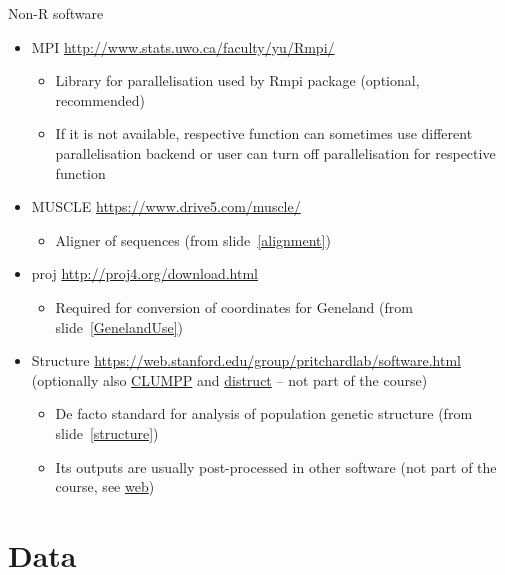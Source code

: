 \documentclass[compress, ucs, xelatex, 11pt, xcolor=svgnames,
  hyperref={
    bookmarks=true,
    unicode=true,
    colorlinks=true,
    pdftitle={Molecular data in R},
    plainpages=false,
    pdfauthor={Vojtech Zeisek},
    pdfsubject={Course about phylogeny and evolution in R},
    pdfcreator={XeLaTeX},
    pdfkeywords={R, evolution, phylogeny, molecular data},
    linkcolor=Tomato,
    anchorcolor=SaddleBrown,
    citecolor=Goldenrod,
    filecolor=DarkMagenta,
    menucolor=Sienna,
    urlcolor=DarkTurquoise,
    pdftex},
  url={hyphens, lowtilde} %
  ]{beamer}
\begin{document}
\begin{frame}[allowframebreaks]{Non-R software}
\begin{itemize}
\begin{itemize}
    \end{itemize}
    \item MPI \url{http://www.stats.uwo.ca/faculty/yu/Rmpi/}
    \begin{itemize}
      \item Library for parallelisation used by Rmpi package (optional, recommended)
      \item If it is not available, respective function can sometimes use different parallelisation backend or user can turn off parallelisation for respective function
    \end{itemize}
    \item MUSCLE \url{https://www.drive5.com/muscle/}
    \begin{itemize}
      \item Aligner of sequences (from slide~\ref{alignment})
    \end{itemize}
    \item proj \url{http://proj4.org/download.html}
    \begin{itemize}
      \item Required for conversion of coordinates for Geneland (from slide~\ref{GenelandUse})
    \end{itemize}
    \item Structure \url{https://web.stanford.edu/group/pritchardlab/software.html} (optionally also \href{https://web.stanford.edu/group/rosenberglab/clumpp.html}{CLUMPP} and \href{https://web.stanford.edu/group/rosenberglab/distruct.html}{distruct} -- not part of the course)
    \begin{itemize}
      \item De facto standard for analysis of population genetic structure (from slide~\ref{structure})
      \item Its outputs are usually post-processed in other software (not part of the course, see \href{https://trapa.cz/en/structure-r-linux}{web})
    \end{itemize}
  \end{itemize}
\end{frame}

\section{Data}
\end{document}
